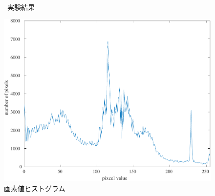 \begin{figure}[H]
\begin{minipage}[b]{.7\textwidth}
\begin{minipage}[b]{.3\textwidth}
        \end{minipage}
        \caption{\kadaiad\ 実験結果}
    \end{minipage}
    \begin{minipage}[b]{.25\textwidth}
        \centering
        \includegraphics[keepaspectratio,width=\textwidth]{../../Figures/05_50_graph.pdf}
        \caption{画素値ヒストグラム\footnotemark[1]}
    \end{minipage}
\end{figure}
